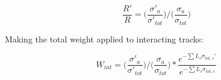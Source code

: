 \documentclass[12pt]{article}
\begin{document}
\begin{equation}
\frac{R'}{R} = \big(\frac{\sigma'_a}{\sigma'_{tot}}\big)/\big(\frac{\sigma_a}{\sigma_{tot}}\big)
\end{equation}

Making the total weight applied to interacting tracks:

\begin{equation}\label{eq:int_weight_pop}
  W_{int} = \big(\frac{\sigma'_a}{\sigma'_{tot}}\big)/\big(\frac{\sigma_a}{\sigma_{tot}}\big) * \frac{e^{-\sum L_s  \sigma_{tot,s}'}}{e^{-\sum L_s  \sigma_{tot,s}}}
\end{equation}
%
\end{document}
